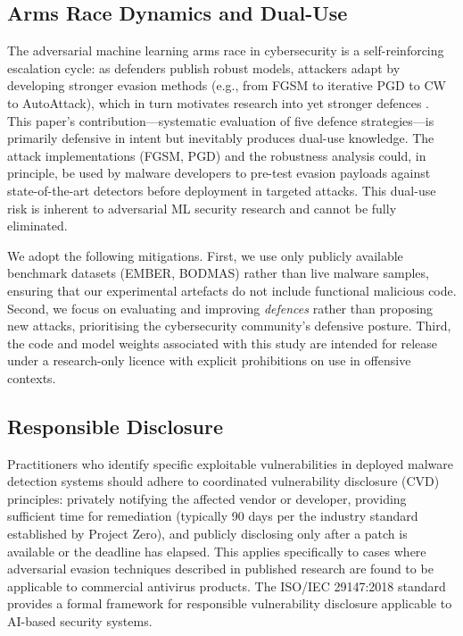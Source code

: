\documentclass[conference]{IEEEtran}
\begin{document}
\subsection{Arms Race Dynamics and Dual-Use}

The adversarial machine learning arms race in cybersecurity is a self-reinforcing escalation cycle: as defenders publish robust models, attackers adapt by developing stronger evasion methods (e.g., from FGSM to iterative PGD to CW to AutoAttack), which in turn motivates research into yet stronger defences \cite{carlini2017,pierazzi2020,athalye2018}. This paper's contribution---systematic evaluation of five defence strategies---is primarily defensive in intent but inevitably produces dual-use knowledge. The attack implementations (FGSM, PGD) and the robustness analysis could, in principle, be used by malware developers to pre-test evasion payloads against state-of-the-art detectors before deployment in targeted attacks. This dual-use risk is inherent to adversarial ML security research and cannot be fully eliminated.

We adopt the following mitigations. First, we use only publicly available benchmark datasets (EMBER, BODMAS) rather than live malware samples, ensuring that our experimental artefacts do not include functional malicious code. Second, we focus on evaluating and improving \emph{defences} rather than proposing new attacks, prioritising the cybersecurity community's defensive posture. Third, the code and model weights associated with this study are intended for release under a research-only licence with explicit prohibitions on use in offensive contexts.

\subsection{Responsible Disclosure}

Practitioners who identify specific exploitable vulnerabilities in deployed malware detection systems should adhere to coordinated vulnerability disclosure (CVD) principles: privately notifying the affected vendor or developer, providing sufficient time for remediation (typically 90 days per the industry standard established by Project Zero), and publicly disclosing only after a patch is available or the deadline has elapsed. This applies specifically to cases where adversarial evasion techniques described in published research are found to be applicable to commercial antivirus products. The ISO/IEC 29147:2018 standard provides a formal framework for responsible vulnerability disclosure applicable to AI-based security systems.
\end{document}
